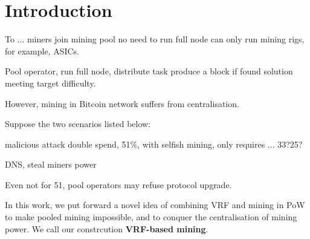 \section{Introduction}




To ... 
miners join mining pool
no need to run full node 
can only run mining rigs, for example, ASICs.

Pool operator, run full node, distribute task
produce a block if found solution meeting target difficulty.

However, mining in Bitcoin network suffers from centralisation.



Suppose the two scenarios listed below:



malicious attack
double spend, 51\%, with selfish mining, only requires ... 33?25?

DNS, steal miners power


Even not for 51, 
pool operators may refuse protocol upgrade. 


In this work, we put forward a novel idea of combining VRF and mining in PoW to make pooled mining impossible, and to conquer the centralisation of mining power.
We call our constrcution \textbf{VRF-based mining}.